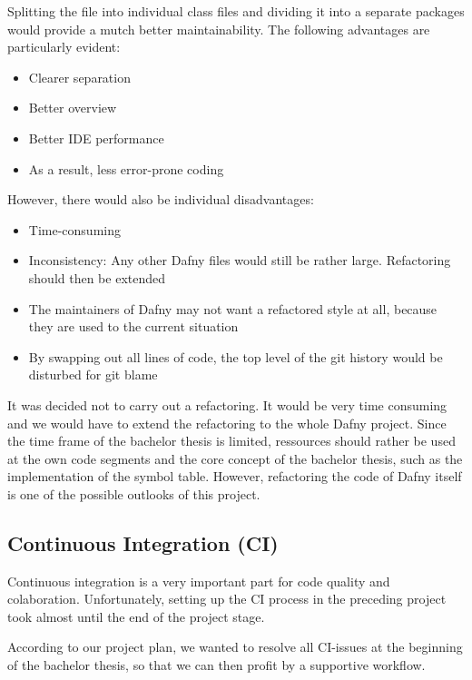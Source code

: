 Splitting the file into individual class files and dividing it into a separate packages would provide a mutch better maintainability.
The following advantages are particularly evident:
\begin{itemize}
    \item Clearer separation
    \item Better overview
    \item Better IDE performance
    \item As a result, less error-prone coding
\end{itemize}

However, there would also be individual disadvantages:
\begin{itemize}
    \item Time-consuming
    \item Inconsistency: Any other Dafny files would still be rather large. Refactoring should then be extended
    \item The maintainers of Dafny may not want a refactored style at all, because they are used to the current situation
    \item By swapping out all lines of code, the top level of the git history would be disturbed for git blame
\end{itemize}

It was decided not to carry out a refactoring.
It would be very time consuming and we would have to extend the refactoring to the whole Dafny project.
Since the time frame of the bachelor thesis is limited, ressources should rather be used at the own code segments and the core concept of the bachelor thesis, such as the implementation of the symbol table.
However, refactoring the code of Dafny itself is one of the possible outlooks of this project.






\subsection{Continuous Integration (CI)}
Continuous integration is a very important part for code quality and colaboration.
Unfortunately, setting up the CI process in the preceding project\cite{sa} took almost until the end of the project stage.

According to our project plan, we wanted to resolve all CI-issues at the beginning of the bachelor thesis, so that we can then profit by a supportive workflow.

